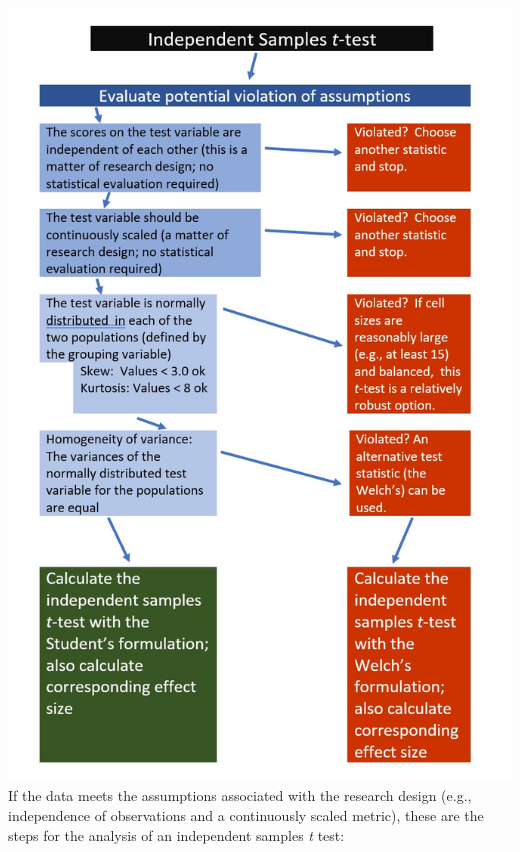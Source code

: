 \documentclass[
  11pt,
]{book}
\begin{document}
\includegraphics{images/ttests/IndSampleWrkFlw.jpg}
If the data meets the assumptions associated with the research design (e.g., independence of observations and a continuously scaled metric), these are the steps for the analysis of an independent samples \emph{t} test:
\end{document}
